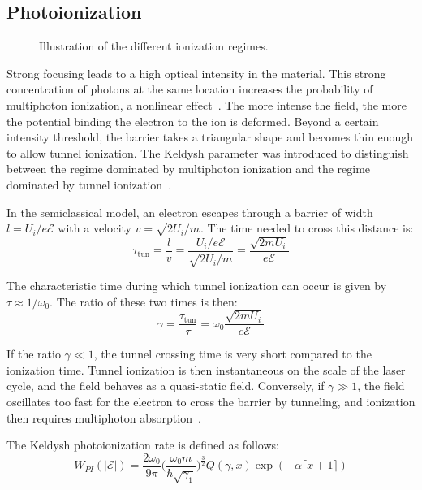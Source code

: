 \subsection{Photoionization}
\label{sec:photoionization}

\begin{figure}[htbp]
    \centering
    \resizebox{\textwidth}{!}{}
    \caption{Illustration of the different ionization regimes.}
    \label{fig:regimes_ionisation}
\end{figure}

Strong focusing leads to a high optical intensity in the material. This strong concentration of photons at the same location increases the probability of multiphoton ionization, a nonlinear effect~\cite{mao2004}. The more intense the field, the more the potential binding the electron to the ion is deformed. Beyond a certain intensity threshold, the barrier takes a triangular shape and becomes thin enough to allow tunnel ionization. The Keldysh parameter was introduced to distinguish between the regime dominated by multiphoton ionization and the regime dominated by tunnel ionization~\cite{mao2004}.

In the semiclassical model, an electron escapes through a barrier of width $l = U_i/e\mathcal{E}$ with a velocity $v = \sqrt{2U_i/m}$. The time needed to cross this distance is:
\begin{equation}
\tau_{\text{tun}} = \frac{l}{v} = \frac{U_i/e\mathcal{E}}{\sqrt{2U_i/m}} = \frac{\sqrt{2m U_i}}{e\mathcal{E}}
\end{equation}

The characteristic time during which tunnel ionization can occur is given by $\tau \approx 1/\omega_0$. The ratio of these two times is then:
\begin{equation}
\gamma = \frac{\tau_{\text{tun}}}{\tau} = \omega_0\frac{\sqrt{2m U_i}}{e\mathcal{E}}
\end{equation}

If the ratio $\gamma \ll 1$, the tunnel crossing time is very short compared to the ionization time. Tunnel ionization is then instantaneous on the scale of the laser cycle, and the field behaves as a quasi-static field. Conversely, if $\gamma \gg 1$, the field oscillates too fast for the electron to cross the barrier by tunneling, and ionization then requires multiphoton absorption~\cite{bulgakova2010}.

The Keldysh photoionization rate is defined as follows:
\begin{equation}
W_{PI}(|\mathcal{E}|) = \frac{2\omega_0}{9\pi}\bigg(\frac{\omega_0m}{\hbar\sqrt{\gamma_1}}\bigg)^{\frac{3}{2}}Q(\gamma,x)\exp(-\alpha\lceil x+1\rceil)
\end{equation}

